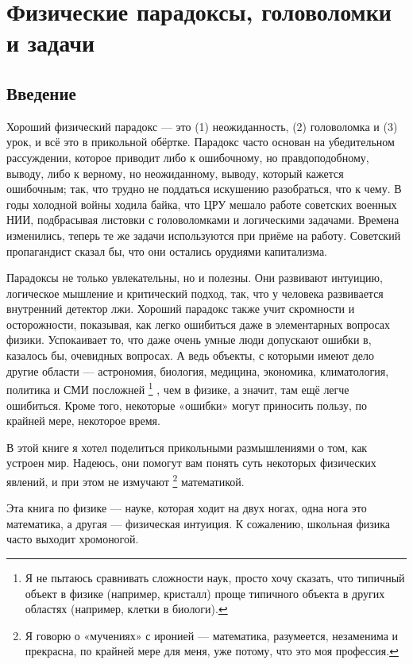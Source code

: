 \chapter[Парадоксы, головоломки, задачи]{Физические парадоксы, головоломки и задачи}

\section{Введение}

Хороший физический парадокс --- это (1) неожиданность, (2) головоломка и (3) урок, и всё это в прикольной обёртке.
Парадокс часто основан на убедительном рассуждении, которое приводит либо к ошибочному, но правдоподобному, выводу, либо к верному, но неожиданному, выводу, который кажется ошибочным;
так, что трудно не поддаться искушению разобраться, что к чему.
В годы холодной войны ходила байка, что ЦРУ мешало работе советских военных НИИ, подбрасывая листовки с головоломками и логическими задачами.
Времена изменились, теперь те же задачи используются при приёме на работу.
Советский пропагандист сказал бы, что они остались орудиями капитализма.

Парадоксы не только увлекательны, но и полезны.
Они развивают интуицию, логическое мышление и критический подход, так, что
у человека развивается внутренний детектор лжи.
Хороший парадокс также учит скромности и осторожности, показывая, как легко ошибиться даже в элементарных вопросах физики.
Успокаивает то, что даже очень умные люди допускают ошибки в, казалось бы, очевидных вопросах.
А ведь объекты, с которыми имеют дело другие области --- астрономия, биология, медицина, экономика, климатология, политика и СМИ посложней%
\footnote{Я не пытаюсь сравнивать сложности наук, просто хочу сказать, что типичный объект в физике (например, кристалл) проще типичного объекта в других областях (например, клетки в биологи).}%
, чем в физике, а значит, там ещё легче ошибиться.
Кроме того, некоторые «ошибки» могут приносить пользу, по крайней мере, некоторое время.

В этой книге я хотел поделиться прикольными размышлениями о том, как устроен мир.
Надеюсь, они помогут вам понять суть некоторых физических явлений, и при этом не измучают%
\footnote{Я говорю о «мучениях» с иронией --- математика, разумеется, незаменима и прекрасна, по крайней мере для меня, уже потому, что это моя профессия.}
математикой.

Эта книга по физике — науке, которая ходит на двух ногах, одна нога это математика, а другая --- физическая интуиция.
К сожалению, школьная физика часто выходит хромоногой.

